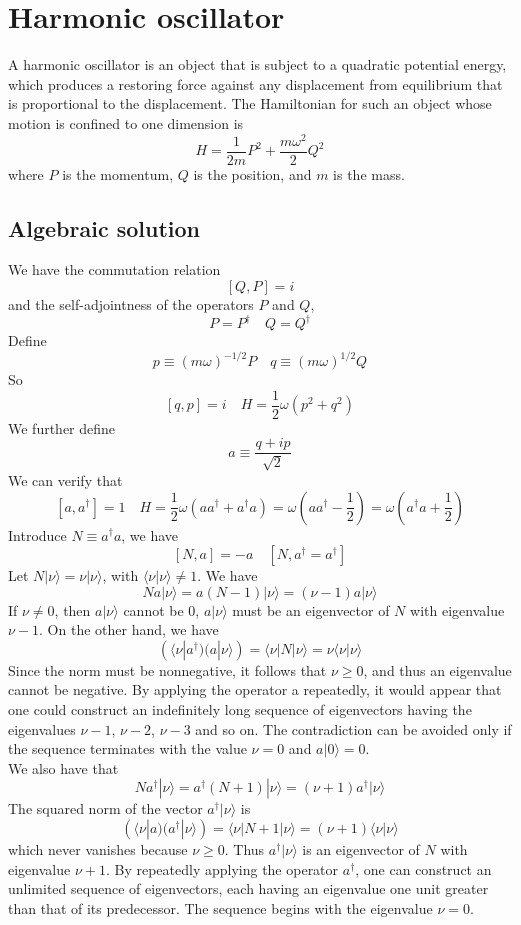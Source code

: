\section{Harmonic oscillator}
A harmonic oscillator is an object that is subject to a quadratic potential energy, which produces a restoring force against any displacement from equilibrium that is proportional to the displacement. The Hamiltonian for such an object whose motion is confined to one dimension is
\[H = \frac{1}{2m}P^2 + \frac{m\omega^2}{2}Q^2\]
where $P$ is the momentum, $Q$ is the position, and $m$ is the mass.
\subsection{Algebraic solution}
We have the commutation relation
\[[Q,P] = i\]
and the self-adjointness of the operators $P$ and $Q$,
\[P = P^{\dagger} \quad Q = Q^{\dagger}\]
Define
\[ p \equiv (m\omega)^{-1/2}P \quad q \equiv (m\omega)^{1/2}Q\]
So
\[[q,p] = i \quad H = \frac{1}{2}\omega(p^2+q^2)\]
We further define
\[a \equiv \frac{q+ip}{\sqrt{2}}\]
We can verify that
\[[a,a^{\dagger}] = 1 \quad H = \frac{1}{2}\omega(aa^{\dagger}+a^{\dagger}a) = \omega(aa^{\dagger}-\frac{1}{2}) = \omega(a^{\dagger}a+\frac{1}{2})\]
Introduce $N \equiv a^{\dagger}a$, we have
\[[N,a] = -a \quad [N,a^{\dagger} = a^{\dagger}]\]
Let $N|\nu\rangle = \nu|\nu\rangle $, with $\langle \nu | \nu \rangle \neq 1$. We have
\[Na|\nu\rangle = a(N-1)|\nu\rangle = (\nu-1)a|\nu\rangle\]
If $\nu \neq 0$, then $a|\nu\rangle$ cannot be $0$, $a|\nu\rangle$ must be an eigenvector of $N$ with eigenvalue $\nu - 1$.
On the other hand, we have
\[(\langle \nu | a^{\dagger})(a|\nu\rangle) = \langle \nu | N | \nu \rangle = \nu \langle \nu | \nu \rangle\]
Since the norm must be nonnegative, it follows that $\nu \geq 0$, and thus an eigenvalue cannot be negative. By applying the operator a repeatedly, it would appear that one could construct an indefinitely long sequence of eigenvectors
having the eigenvalues $\nu-1$, $\nu-2$, $\nu-3$ and so on.
The contradiction can be avoided only if the sequence terminates with the value $\nu=0$ and $a|0\rangle = 0$.\\
We also have that
\[Na^{\dagger}|\nu\rangle = a^{\dagger}(N+1)|\nu\rangle = (\nu+1)a^{\dagger}|\nu\rangle\]
The squared norm of the vector $a^{\dagger} |\nu\rangle$ is
\[(\langle \nu | a)(a^{\dagger} | \nu \rangle)= \langle \nu | N+1|\nu\rangle = (\nu+1) \langle \nu | \nu \rangle \]
which never vanishes because $\nu \geq 0$. Thus $a^{\dagger} | \nu \rangle$ is an eigenvector of $N$ with eigenvalue $\nu+1$. By repeatedly applying the operator $a^{\dagger}$, one can construct an unlimited sequence of eigenvectors, each having an eigenvalue one unit greater than that of its predecessor. The sequence begins with the eigenvalue $\nu=0$.
